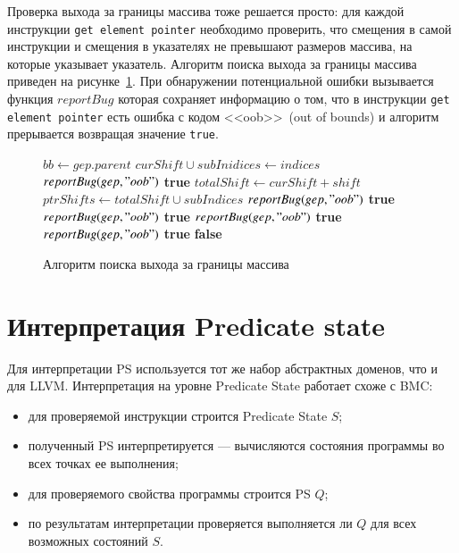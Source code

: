 Проверка выхода за границы массива тоже решается просто: для каждой инструкции
\texttt{get element pointer} необходимо проверить, что смещения в самой инструкции и смещения в 
указателях не превышают размеров массива, на которые указывает указатель. 
Алгоритм поиска выхода за границы массива приведен на 
рисунке~\ref{image:oobChecker}. При обнаружении потенциальной ошибки вызывается
функция $reportBug$ которая сохраняет информацию о том, что в инструкции 
\texttt{get element pointer} есть ошибка с кодом <<oob>>~(out of bounds) и алгоритм 
прерывается возвращая значение \texttt{true}.
\begin{figure}[h!]
\begin{algorithmic}[1]
\State $bb \gets gep.parent$
\State $curShift \cup subInidices \gets indices$
    \State $reportBug(gep, "oob")$
    \State \Return \textbf{true}
            \State $totalShift \gets curShift + shift$
            \State $ptrShifts \gets totalShift \cup subIndices$
                \State $reportBug(gep, "oob")$
                \State \Return \textbf{true}
            \EndIf
        \EndFor
    \EndFor
{}
        \State $reportBug(gep, "oob")$
        \State \Return \textbf{true}
    \EndIf
        \State $reportBug(gep, "oob")$
        \State \Return \textbf{true}
    \EndIf
            \State $reportBug(gep, "oob")$
            \State \Return \textbf{true}
        \EndIf
    \EndFor
\EndIf
\State \Return \textbf{false}    
\EndFunction
\end{algorithmic}
\caption{Алгоритм поиска выхода за границы массива}
\label{image:oobChecker}
\end{figure}

\section{Интерпретация Predicate state}
Для интерпретации PS используется тот же набор абстрактных доменов, что и для 
LLVM. Интерпретация на уровне Predicate State работает схоже с BMC:
\begin{itemize}
\item для проверяемой инструкции строится Predicate State $S$;
\item полученный PS интерпретируется --- вычисляются состояния программы
во всех точках ее выполнения;
\item для проверяемого свойства программы строится PS $Q$;
\item по результатам интерпретации проверяется выполняется ли $Q$ для всех 
возможных состояний $S$.
\end{itemize}

